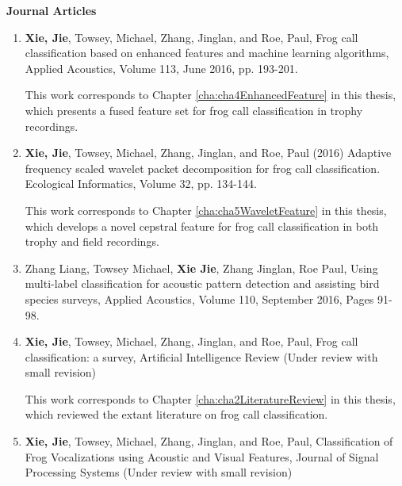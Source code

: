 {\textbf{Journal Articles}}
\begin{enumerate} 

\item  \textbf{Xie, Jie}, Towsey, Michael, Zhang, Jinglan, and Roe, Paul, Frog call classification based on enhanced features and machine learning algorithms, Applied Acoustics, Volume 113, June 2016, pp. 193-201.

This work corresponds to Chapter \ref{cha:cha4EnhancedFeature} in this thesis, which presents a fused feature set for frog call classification in trophy recordings.

\item	\textbf{Xie, Jie}, Towsey, Michael, Zhang, Jinglan, and Roe, Paul (2016) Adaptive frequency scaled wavelet packet decomposition for frog call classification.  Ecological Informatics, Volume 32, pp. 134-144.

This work corresponds to Chapter \ref{cha:cha5WaveletFeature} in this thesis, which develops a novel cepstral feature for frog call classification in both trophy and field recordings.



\item	Zhang Liang, Towsey Michael, \textbf{Xie Jie}, Zhang Jinglan, Roe Paul,  Using multi-label classification for acoustic pattern detection and assisting bird species surveys, Applied Acoustics, Volume 110, September 2016, Pages 91-98.

\item \textbf{Xie, Jie}, Towsey, Michael, Zhang, Jinglan, and Roe, Paul, Frog call classification: a survey, Artificial Intelligence Review (Under review with small revision)


This work corresponds to Chapter \ref{cha:cha2LiteratureReview} in this thesis, which reviewed the extant literature on frog call classification.



\item \textbf{Xie, Jie}, Towsey, Michael, Zhang, Jinglan, and Roe, Paul, Classification of Frog Vocalizations using Acoustic and Visual Features, Journal of Signal Processing Systems  (Under review with small revision)






\end{enumerate}

